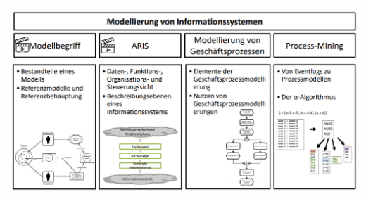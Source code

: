 \documentclass[a4]{scrartcl}
\begin{document}
\begin{center}
    \includegraphics[width=18cm]{digi4.png}
\end{center}
\end{document}
